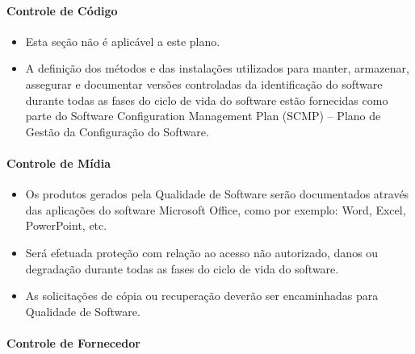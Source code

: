 \paragraph{Controle de Código}

\begin{itemize}
\item Esta seção não é aplicável a este plano.

\item A definição dos métodos e das instalações utilizados para manter, armazenar, assegurar e documentar versões controladas da identificação do software durante todas as fases do ciclo de vida do software estão fornecidas como parte do Software Configuration Management Plan (SCMP) – Plano de Gestão da Configuração do Software.

\end{itemize}

\paragraph{Controle de Mídia}

\begin{itemize}
\item Os produtos gerados pela Qualidade de Software serão documentados através das aplicações do software Microsoft Office, como por exemplo: Word, Excel, PowerPoint, etc.

\item Será efetuada proteção com relação ao acesso não autorizado, danos ou degradação durante todas as fases do ciclo de vida do software.

\item As solicitações de cópia ou recuperação deverão ser encaminhadas para Qualidade de Software.
\end{itemize}

\paragraph{Controle de Fornecedor}

